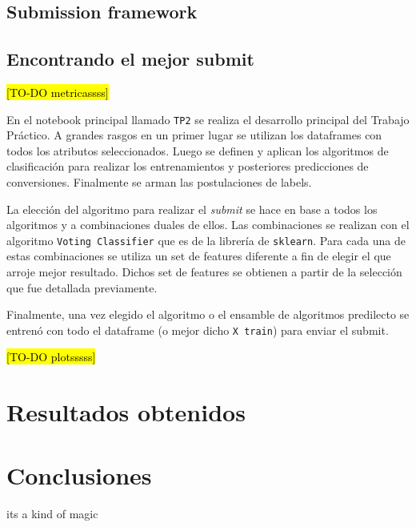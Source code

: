\documentclass[a4paper]{article}
\begin{document}
\subsection{Submission framework}


\subsection{Encontrando el mejor submit}

\hl{[TO-DO metricassss]}

En el notebook principal llamado \texttt{TP2} se realiza el desarrollo principal del Trabajo Práctico. A grandes rasgos en un primer lugar se utilizan los dataframes con todos los atributos seleccionados. Luego se definen y aplican los algoritmos de clasificación para realizar los entrenamientos y posteriores predicciones de conversiones. Finalmente se arman las postulaciones de labels.

La elección del algoritmo para realizar el \textit{submit} se hace en base a todos los algoritmos y a combinaciones duales de ellos. Las combinaciones se realizan con el algoritmo \texttt{Voting Classifier} que es de la librería de \texttt{sklearn}. Para cada una de estas combinaciones se utiliza un set de features diferente a fin de elegir el que arroje mejor resultado. Dichos set de features se obtienen a partir de la selección que fue detallada previamente.

Finalmente, una vez elegido el algoritmo o el ensamble de algoritmos predilecto se entrenó con todo el dataframe (o mejor dicho \texttt{X train}) para enviar el submit.

\hl{[TO-DO plotsssss]}

\section{Resultados obtenidos}

\section{Conclusiones}
its a kind of magic
\end{document}
